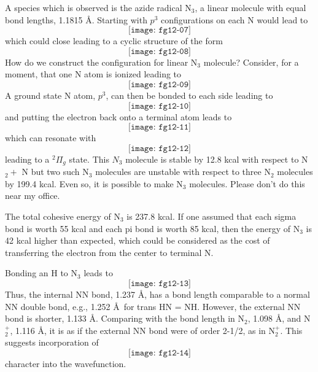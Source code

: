 A species which is observed is the azide radical N$_3$, a linear molecule with 
equal bond lengths, 1.1815 \AA.  Starting with $p^3$ configurations on each 
N would lead to
\begin{equation}
\texttt{[image: fg12-07]}
\end{equation}
which could close leading to a cyclic structure of the form
\begin{equation}
\texttt{[image: fg12-08]}
\end{equation}
How do we construct the configuration for linear N$_3$ molecule?  
Consider, for a moment, that one N atom is ionized leading to
\begin{equation}
\texttt{[image: fg12-09]}
\end{equation}
A ground state N atom, $p^3$, can then be bonded to each side leading to
\begin{equation}
\texttt{[image: fg12-10]}
\end{equation}
and putting the electron back onto a terminal atom leads to
\begin{equation}
\texttt{[image: fg12-11]}
\end{equation}
which can resonate with
\begin{equation}
\texttt{[image: fg12-12]}
\end{equation}
leading to a ${^2\Pi}_g$ state.  This $N_3$ molecule is stable by 12.8 kcal with 
respect to N$_2 +$ N but two such
N$_3$ molecules are unstable with respect to three N$_2$ molecules by 199.4 
kcal.  Even so, it is
possible to make N$_3$ molecules.  Please don't do this near my office.

The total cohesive energy of N$_3$ is 237.8 kcal.  If one assumed that 
each sigma bond is worth 55 kcal and
each pi bond is worth 85 kcal, then the energy of N$_3$ is 42 kcal higher than 
expected, which could
be considered as the cost of transferring the electron from the center to 
terminal N.

Bonding an H to N$_3$ leads to
\begin{equation}
\texttt{[image: fg12-13]}
\end{equation}
Thus, the internal NN bond, 1.237 \AA, has a bond length comparable to a 
normal NN double bond, e.g.,
1.252 \AA\ for trans HN = NH.  However, the external NN bond is 
shorter, 1.133 \AA.    Comparing with
the bond length in N$_2$, 1.098 \AA, and N$^+_2$, 1.116 \AA, 
it is as if the external NN bond were of order 2-1/2, as in N$^+_2$.  
This suggests incorporation of
\begin{equation}
\texttt{[image: fg12-14]}
\end{equation}
character into the wavefunction.


